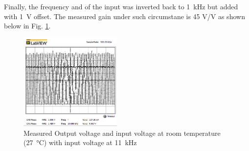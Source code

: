 \documentclass[journal]{IEEEtran}
\begin{document}
\par Finally, the frequency and of the input was inverted back to \SI{1}{\kilo\hertz} but added with \SI{1}{\volt} offset.
The measured gain under such circumstane is 45 \si{\volt}/\si{\volt} as shown below in Fig. \ref{fig-2-3}.
\begin{figure}[h]
\centering
\includegraphics[width=0.45\textwidth]{images/2-3.png}
  \caption{Measured Output voltage and input voltage at room temperature (\SI{27}{\celsius}) with input voltage at \SI{11}{\kilo\hertz}}
\label{fig-2-3}
\end{figure}
\end{document}

